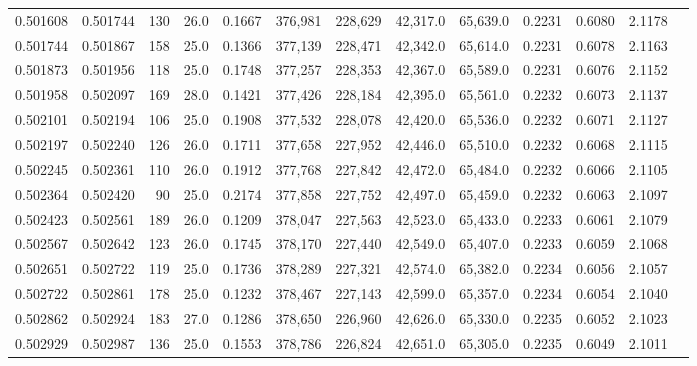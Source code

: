 \begin{tabular}{rrrrrrrrrrrrr}
0.501608 & 0.501744 &   130 & 26.0 &                                     0.1667 & 376,981 & 228,629 &  42,317.0 &  65,639.0 & 0.2231 & 0.6080 & 2.1178 \\
0.501744 & 0.501867 &   158 & 25.0 &                                     0.1366 & 377,139 & 228,471 &  42,342.0 &  65,614.0 & 0.2231 & 0.6078 & 2.1163 \\
0.501873 & 0.501956 &   118 & 25.0 &                                     0.1748 & 377,257 & 228,353 &  42,367.0 &  65,589.0 & 0.2231 & 0.6076 & 2.1152 \\
0.501958 & 0.502097 &   169 & 28.0 &                                     0.1421 & 377,426 & 228,184 &  42,395.0 &  65,561.0 & 0.2232 & 0.6073 & 2.1137 \\
0.502101 & 0.502194 &   106 & 25.0 &                                     0.1908 & 377,532 & 228,078 &  42,420.0 &  65,536.0 & 0.2232 & 0.6071 & 2.1127 \\
0.502197 & 0.502240 &   126 & 26.0 &                                     0.1711 & 377,658 & 227,952 &  42,446.0 &  65,510.0 & 0.2232 & 0.6068 & 2.1115 \\
0.502245 & 0.502361 &   110 & 26.0 &                                     0.1912 & 377,768 & 227,842 &  42,472.0 &  65,484.0 & 0.2232 & 0.6066 & 2.1105 \\
0.502364 & 0.502420 &    90 & 25.0 &                                     0.2174 & 377,858 & 227,752 &  42,497.0 &  65,459.0 & 0.2232 & 0.6063 & 2.1097 \\
0.502423 & 0.502561 &   189 & 26.0 &                                     0.1209 & 378,047 & 227,563 &  42,523.0 &  65,433.0 & 0.2233 & 0.6061 & 2.1079 \\
0.502567 & 0.502642 &   123 & 26.0 &                                     0.1745 & 378,170 & 227,440 &  42,549.0 &  65,407.0 & 0.2233 & 0.6059 & 2.1068 \\
0.502651 & 0.502722 &   119 & 25.0 &                                     0.1736 & 378,289 & 227,321 &  42,574.0 &  65,382.0 & 0.2234 & 0.6056 & 2.1057 \\
0.502722 & 0.502861 &   178 & 25.0 &                                     0.1232 & 378,467 & 227,143 &  42,599.0 &  65,357.0 & 0.2234 & 0.6054 & 2.1040 \\
0.502862 & 0.502924 &   183 & 27.0 &                                     0.1286 & 378,650 & 226,960 &  42,626.0 &  65,330.0 & 0.2235 & 0.6052 & 2.1023 \\
0.502929 & 0.502987 &   136 & 25.0 &                                     0.1553 & 378,786 & 226,824 &  42,651.0 &  65,305.0 & 0.2235 & 0.6049 & 2.1011 \\

\end{tabular}
